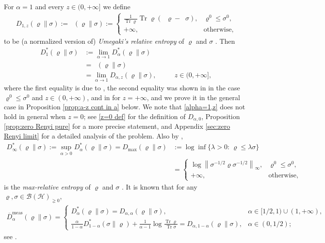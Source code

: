 \documentclass[unsortedaddress,superscriptaddress,pra,notitlepage]{revtex4}
\newcommand{\nn}{\nonumber \\}
\def\B{{\mathcal B}}
\def\rho{\varrho}
\def\hil{{\mathcal H}}
\def\oll{\overline}
\def\nn{\nonumber}
\def\nw{^{*}}
\def\meas{\mathrm{meas}}
\def\pne{_{\gneq 0}}
\newcommand{\ki}[1]{\textit{\textit{#1}}}
\newcommand{\ds}{\mbox{ }\mbox{ }}
\newcommand{\norm}[1]{\left\| #1\right\|}
\DeclareMathOperator{\Tr}{Tr}
\DeclareMathOperator{\logn}{\widehat\log}
\DeclareMathOperator{\DU}{\mathit{D}^{Um}}
\begin{document}
For $\alpha=1$ and every $z\in(0,+\infty]$ we define
\begin{align}
D_{1,z}(\rho\|\sigma):=\DU(\rho\|\sigma)
:=\begin{cases}
\frac{1}{\Tr\rho}\Tr\rho(\logn\rho-\logn\sigma),&\rho^0\le\sigma^0,\\
+\infty,&\text{otherwise},
\end{cases}\label{relent}
\end{align}
to be (a normalized version of) \ki{Umegaki's relative entropy} of $\rho$ and $\sigma$ \cite{Umegaki}.
Then
\begin{align}
D_1\nw(\rho\|\sigma)
&:=
\lim_{\alpha\to 1}D_{\alpha}\nw(\rho\|\sigma)\nn\\
&=\DU(\rho\|\sigma)\nn\\
&=
\lim_{\alpha\to 1}D_{\alpha,z}(\rho\|\sigma),\ds\ds z\in(0,+\infty],
\label{alpha=1,z}
\end{align}
where the first equality is due to \cite[Theorem 5]{Renyi_new}, the second equality 
was shown in \cite[Proposition 3]{LinTomamichel15} in the case 
$\rho^0\le\sigma^0$ and $z\in(0,+\infty)$, and in 
\cite[Lemma 3.5]{MO-cqconv} for $z=+\infty$, and we prove it in the general case in 
Proposition \ref{prop:a-z cont in a} below.
We note that \eqref{alpha=1,z} does not hold in general when $z=0$; 
see \eqref{z=0 def} for the definition of $D_{\alpha,0}$, 
Proposition \ref{prop:zero Renyi pure} for a more precise statement, and Appendix 
\ref{sec:zero Renyi limit} for a detailed analysis of the problem.
Also by \cite[Theorem 5]{Renyi_new},
\begin{align*}
D_{\infty}\nw(\rho\|\sigma):=\sup_{\alpha>0}D_{\alpha}\nw(\rho\|\sigma)=
D_{\max}(\rho\|\sigma)
&:=
\log\inf\{\lambda>0:\,\rho\le\lambda\sigma\}\nn\\
&=\begin{cases}
\log\norm{\sigma^{-1/2}\rho\sigma^{-1/2}}_{\infty},&\rho^0\le\sigma^0,\\
+\infty,&\text{otherwise},
\end{cases}
\end{align*}
is the \ki{max-relative entropy} of $\rho$ and $\sigma$ \cite{Datta,RennerPhD}.
It is known that for any $\rho,\sigma\in\B(\hil)\pne$, 
\begin{align}\label{reg measured}
\oll{D}_{\alpha}^{\meas}(\rho\|\sigma)
=
\begin{cases}
D_{\alpha}\nw(\rho\|\sigma)=D_{\alpha,\alpha}(\rho\|\sigma),&\alpha\in[1/2,1)\cup(1,+\infty),\\
\frac{\alpha}{1-\alpha}D_{1-\alpha}\nw(\sigma\|\rho)
+\frac{1}{\alpha-1}\log\frac{\Tr\rho}{\Tr\sigma}
=D_{\alpha,1-\alpha}(\rho\|\sigma),&\alpha\in(0,1/2);
\end{cases}
\end{align}
see \cite{HT14,MO,MH-testdiv,Vrana_private}.
\end{document}

